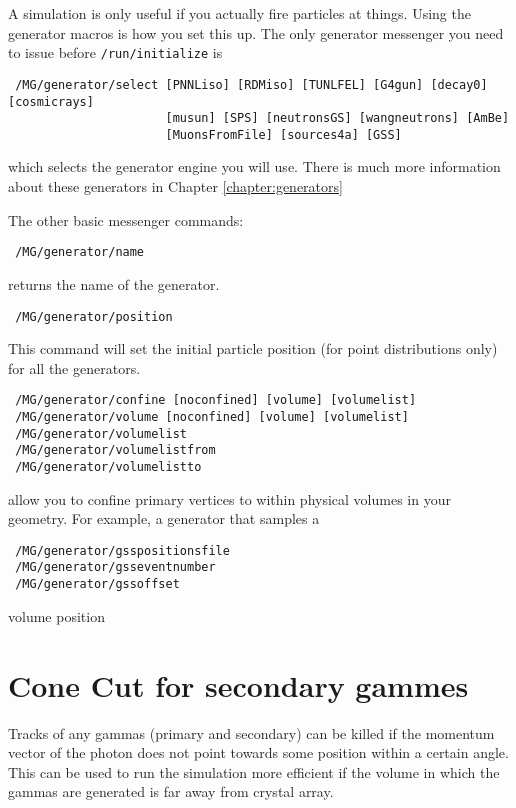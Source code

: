 A simulation is only useful if you actually fire particles at things.  Using the
generator macros is how you set this up.  The only generator messenger you need
to issue before \texttt{/run/initialize} is
\begin{lstlisting}
 /MG/generator/select [PNNLiso] [RDMiso] [TUNLFEL] [G4gun] [decay0] [cosmicrays] 
                      [musun] [SPS] [neutronsGS] [wangneutrons] [AmBe] 
                      [MuonsFromFile] [sources4a] [GSS]
\end{lstlisting}
which selects the generator engine you will use.  There is much more information
about these generators in Chapter \ref{chapter:generators}

The other basic messenger commands:
\begin{lstlisting}
 /MG/generator/name
\end{lstlisting}
returns the name of the generator.

\begin{lstlisting}
 /MG/generator/position
\end{lstlisting}
This command will set the initial particle position (for point distributions
only) for all the generators.


\begin{lstlisting}
 /MG/generator/confine [noconfined] [volume] [volumelist]
 /MG/generator/volume [noconfined] [volume] [volumelist]
 /MG/generator/volumelist
 /MG/generator/volumelistfrom
 /MG/generator/volumelistto
\end{lstlisting}
allow you to confine primary vertices to within physical volumes in your
geometry.   For example, a generator that samples a 

\begin{lstlisting}
 /MG/generator/gsspositionsfile
 /MG/generator/gsseventnumber
 /MG/generator/gssoffset
\end{lstlisting}



volume
position





\section{Cone Cut for secondary gammes} \label{section:GammaConeCut}

Tracks of any gammas (primary and secondary) can be killed if the momentum vector of the photon does not point 
towards some position within a certain angle. \\
This can be used to run the simulation more efficient if the volume 
in which the gammas are generated is far away from crystal array. \\

